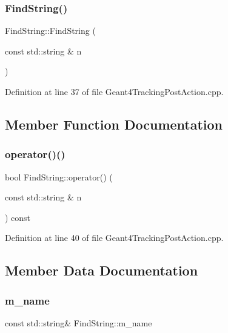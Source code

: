 \subsubsection{\texorpdfstring{Find\+String()}{FindString()}}
{\footnotesize\ttfamily Find\+String\+::\+Find\+String (\begin{DoxyParamCaption}\item[{const std\+::string \&}]{n }\end{DoxyParamCaption})\hspace{0.3cm}{\ttfamily [inline]}}



Definition at line 37 of file Geant4\+Tracking\+Post\+Action.\+cpp.



\subsection{Member Function Documentation}
\hypertarget{struct_find_string_a73fa4402f77de5ffa983733c2092ad1f}{}\label{struct_find_string_a73fa4402f77de5ffa983733c2092ad1f} 
\subsubsection{\texorpdfstring{operator()()}{operator()()}}
{\footnotesize\ttfamily bool Find\+String\+::operator() (\begin{DoxyParamCaption}\item[{const std\+::string \&}]{n }\end{DoxyParamCaption}) const\hspace{0.3cm}{\ttfamily [inline]}}



Definition at line 40 of file Geant4\+Tracking\+Post\+Action.\+cpp.



\subsection{Member Data Documentation}
\hypertarget{struct_find_string_a7acb1627655d24666e9107df3b60441a}{}\label{struct_find_string_a7acb1627655d24666e9107df3b60441a} 
\subsubsection{\texorpdfstring{m\+\_\+name}{m\_name}}
{\footnotesize\ttfamily const std\+::string\& Find\+String\+::m\+\_\+name}



